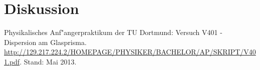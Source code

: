 \section{Diskussion}
\label{diskussion}

\begin{thebibliography}{9}
	 Physikalisches Anf"angerpraktikum der TU Dortmund: Versuch V401 - Dispersion am Glasprisma. \url{http://129.217.224.2/HOMEPAGE/PHYSIKER/BACHELOR/AP/SKRIPT/V401.pdf}. Stand: Mai 2013.
\end{thebibliography}
